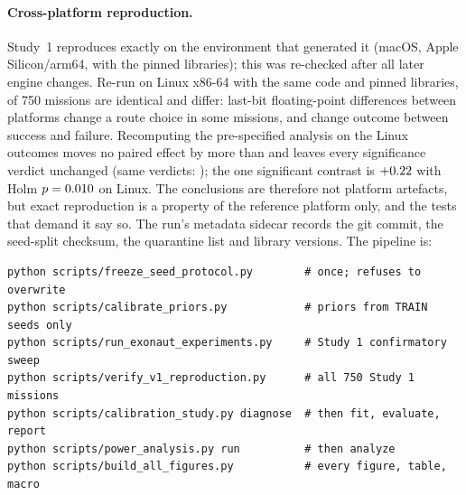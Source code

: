\documentclass[11pt]{article}
\begin{document}
\paragraph{Cross-platform reproduction.} Study~1 reproduces exactly on the
environment that generated it (macOS, Apple Silicon/arm64, with the pinned
libraries); this was re-checked after all later engine changes. Re-run on Linux x86-64 with the same
code and pinned libraries, \XpIdentical{} of 750 missions are identical and
\XpDiffer{} differ: last-bit floating-point differences between platforms change
a route choice in some missions, and \XpFlipped{} change outcome between success
and failure. Recomputing the pre-specified analysis on the Linux outcomes moves
no paired effect by more than \XpMaxShift{} and leaves every significance
verdict unchanged (same verdicts: \XpSameVerdicts{}); the one significant
contrast is $+0.22$ with Holm $p = 0.010$ on Linux. The
conclusions are therefore not platform artefacts, but exact reproduction is a
property of the reference platform only, and the tests that demand it say so. The run's metadata sidecar records the git commit, the seed-split
checksum, the quarantine list and library versions. The pipeline is:

\begin{verbatim}
python scripts/freeze_seed_protocol.py        # once; refuses to overwrite
python scripts/calibrate_priors.py            # priors from TRAIN seeds only
python scripts/run_exonaut_experiments.py     # Study 1 confirmatory sweep
python scripts/verify_v1_reproduction.py      # all 750 Study 1 missions
python scripts/calibration_study.py diagnose  # then fit, evaluate, report
python scripts/power_analysis.py run          # then analyze
python scripts/build_all_figures.py           # every figure, table, macro
\end{verbatim}



\end{document}
